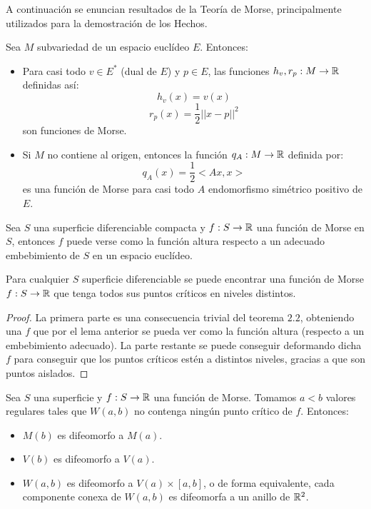 
A continuación se enuncian resultados de la Teoría de Morse, principalmente utilizados para la demostración de los Hechos.

\begin{teorema}
	Sea $M$ subvariedad de un espacio euclídeo $E$. Entonces:
	\begin{itemize}
		\item Para casi todo $v \in E^*$ (dual de $E$) y $p \in E$, las funciones $h_v, r_p : M \rightarrow \mathbb{R}$ definidas así:
			$$h_v(x)=v(x)$$
			$$r_p(x)=\frac{1}{2}||x-p||^2$$
		son funciones de Morse.
		\item Si $M$ no contiene al origen, entonces la función $q_A: M \rightarrow \mathbb{R}$ definida por:
			$$q_A(x)=\frac{1}{2}<Ax,x>$$
		es una función de Morse para casi todo $A$ endomorfismo simétrico positivo de $E$.
	\end{itemize}
\end{teorema}

\begin{lema}
	Sea $S$ una superficie diferenciable compacta y $f:S \rightarrow \mathbb{R}$ una función de Morse en $S$, entonces $f$ puede verse como la función altura respecto a un adecuado embebimiento de $S$ en un espacio euclídeo. 
\end{lema}

\begin{corolario}
	Para cualquier $S$ superficie diferenciable se puede encontrar una función de Morse $f:S \rightarrow \mathbb{R}$ que tenga todos sus puntos críticos en niveles distintos.
\end{corolario}

\begin{proof}
	La primera parte es una consecuencia trivial del teorema $2.2$, obteniendo una $f$ que por el lema anterior se pueda ver como la función altura (respecto a un embebimiento adecuado). La parte restante se puede conseguir deformando dicha $f$ para conseguir que los puntos críticos estén a distintos niveles, gracias a que son puntos aislados.
\end{proof}

\begin{teorema}
	Sea $S$ una superficie y $f: S \rightarrow \mathbb{R}$ una función de Morse. Tomamos $a < b$ valores regulares tales que $W(a,b)$ no contenga ningún punto crítico de $f$. Entonces:
	\begin{itemize}
		\item $M(b)$ es difeomorfo a $M(a)$.
		\item $V(b)$ es difeomorfo a $V(a)$.
		\item $W(a,b)$ es difeomorfo a $V(a) \times [a,b]$, o de forma equivalente, cada componente conexa de $W(a,b)$ es difeomorfa a un anillo de $\mathbb{R}^2$.
	\end{itemize}
\end{teorema}

